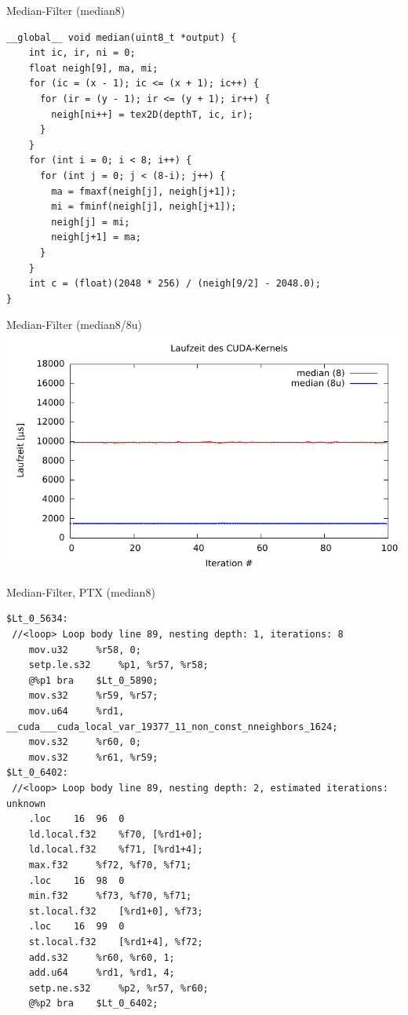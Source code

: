 \documentclass[compress]{beamer}
\begin{document}
\begin{frame}[fragile]{Median-Filter (median8)}
\begin{lstlisting}
__global__ void median(uint8_t *output) {
    int ic, ir, ni = 0;
    float neigh[9], ma, mi;
    for (ic = (x - 1); ic <= (x + 1); ic++) {
      for (ir = (y - 1); ir <= (y + 1); ir++) {
        neigh[ni++] = tex2D(depthT, ic, ir);
      }
    }
    for (int i = 0; i < 8; i++) {
      for (int j = 0; j < (8-i); j++) {
        ma = fmaxf(neigh[j], neigh[j+1]);
        mi = fminf(neigh[j], neigh[j+1]);
        neigh[j] = mi;
        neigh[j+1] = ma;
      }
    }
    int c = (float)(2048 * 256) / (neigh[9/2] - 2048.0);
}
\end{lstlisting}
\end{frame}


\begin{frame}[fragile]{Median-Filter (median8/8u)}
\includegraphics[width=\textwidth]{median88u.pdf}
\end{frame}

\begin{frame}[fragile]{Median-Filter, PTX (median8)}
\lstset{basicstyle=\tiny\ttfamily}
\begin{lstlisting}
$Lt_0_5634:
 //<loop> Loop body line 89, nesting depth: 1, iterations: 8
    mov.u32     %r58, 0;
    setp.le.s32     %p1, %r57, %r58;
    @%p1 bra    $Lt_0_5890;
    mov.s32     %r59, %r57;
    mov.u64     %rd1, __cuda___cuda_local_var_19377_11_non_const_nneighbors_1624;
    mov.s32     %r60, 0;
    mov.s32     %r61, %r59;
$Lt_0_6402:
 //<loop> Loop body line 89, nesting depth: 2, estimated iterations: unknown
    .loc    16  96  0
    ld.local.f32    %f70, [%rd1+0];
    ld.local.f32    %f71, [%rd1+4];
    max.f32     %f72, %f70, %f71;
    .loc    16  98  0
    min.f32     %f73, %f70, %f71;
    st.local.f32    [%rd1+0], %f73;
    .loc    16  99  0
    st.local.f32    [%rd1+4], %f72;
    add.s32     %r60, %r60, 1;
    add.u64     %rd1, %rd1, 4;
    setp.ne.s32     %p2, %r57, %r60;
    @%p2 bra    $Lt_0_6402;
\end{lstlisting}
\end{frame}
\end{document}
